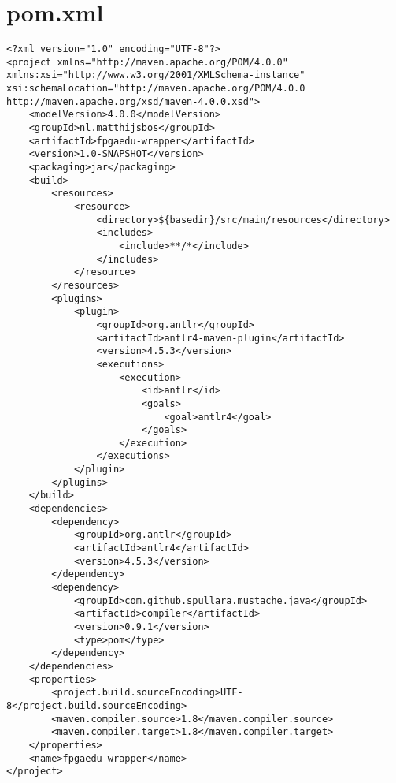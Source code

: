 \documentclass[main.tex]{subfiles}
\begin{document}
\section{pom.xml}
\begin{lstlisting}[caption={Contents of \texttt{./pom.xml}}]
<?xml version="1.0" encoding="UTF-8"?>
<project xmlns="http://maven.apache.org/POM/4.0.0" xmlns:xsi="http://www.w3.org/2001/XMLSchema-instance" xsi:schemaLocation="http://maven.apache.org/POM/4.0.0 http://maven.apache.org/xsd/maven-4.0.0.xsd">
    <modelVersion>4.0.0</modelVersion>
    <groupId>nl.matthijsbos</groupId>
    <artifactId>fpgaedu-wrapper</artifactId>
    <version>1.0-SNAPSHOT</version>
    <packaging>jar</packaging>
    <build>
        <resources>
            <resource> 
                <directory>${basedir}/src/main/resources</directory>
                <includes>
                    <include>**/*</include>
                </includes>
            </resource>
        </resources>
        <plugins>
            <plugin>
                <groupId>org.antlr</groupId>
                <artifactId>antlr4-maven-plugin</artifactId>
                <version>4.5.3</version>
                <executions>
                    <execution>
                        <id>antlr</id>
                        <goals>
                            <goal>antlr4</goal>
                        </goals>
                    </execution>
                </executions>
            </plugin>
        </plugins>
    </build>
    <dependencies>
        <dependency>
            <groupId>org.antlr</groupId>
            <artifactId>antlr4</artifactId>
            <version>4.5.3</version>
        </dependency>
        <dependency>
            <groupId>com.github.spullara.mustache.java</groupId>
            <artifactId>compiler</artifactId>
            <version>0.9.1</version>
            <type>pom</type>
        </dependency>
    </dependencies>
    <properties>
        <project.build.sourceEncoding>UTF-8</project.build.sourceEncoding>
        <maven.compiler.source>1.8</maven.compiler.source>
        <maven.compiler.target>1.8</maven.compiler.target>
    </properties>
    <name>fpgaedu-wrapper</name>
</project>
\end{lstlisting}

\restoregeometry
\end{document}
